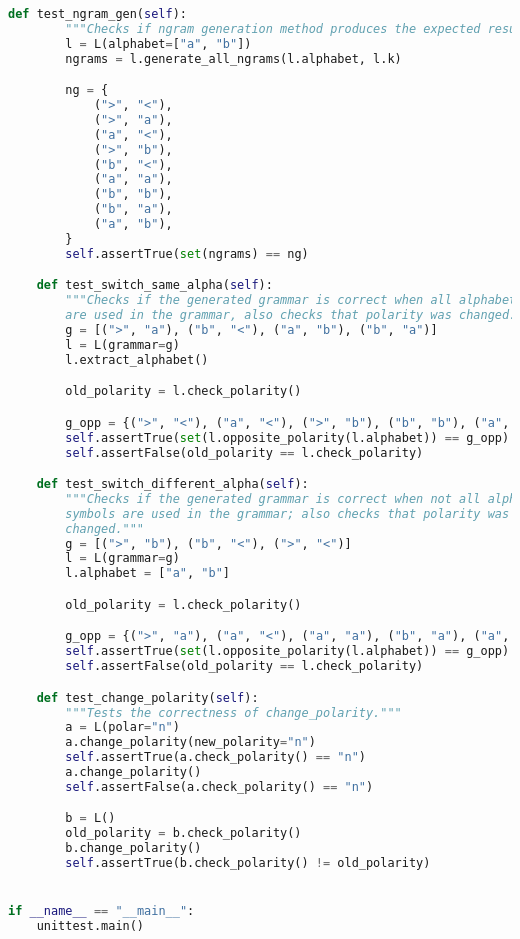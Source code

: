 \begin{lstlisting}[language=Python]
    def test_ngram_gen(self):
        """Checks if ngram generation method produces the expected results."""
        l = L(alphabet=["a", "b"])
        ngrams = l.generate_all_ngrams(l.alphabet, l.k)

        ng = {
            (">", "<"),
            (">", "a"),
            ("a", "<"),
            (">", "b"),
            ("b", "<"),
            ("a", "a"),
            ("b", "b"),
            ("b", "a"),
            ("a", "b"),
        }
        self.assertTrue(set(ngrams) == ng)

    def test_switch_same_alpha(self):
        """Checks if the generated grammar is correct when all alphabet symbols
        are used in the grammar, also checks that polarity was changed."""
        g = [(">", "a"), ("b", "<"), ("a", "b"), ("b", "a")]
        l = L(grammar=g)
        l.extract_alphabet()

        old_polarity = l.check_polarity()

        g_opp = {(">", "<"), ("a", "<"), (">", "b"), ("b", "b"), ("a", "a")}
        self.assertTrue(set(l.opposite_polarity(l.alphabet)) == g_opp)
        self.assertFalse(old_polarity == l.check_polarity)

    def test_switch_different_alpha(self):
        """Checks if the generated grammar is correct when not all alphabet
        symbols are used in the grammar; also checks that polarity was
        changed."""
        g = [(">", "b"), ("b", "<"), (">", "<")]
        l = L(grammar=g)
        l.alphabet = ["a", "b"]

        old_polarity = l.check_polarity()

        g_opp = {(">", "a"), ("a", "<"), ("a", "a"), ("b", "a"), ("a", "b"), ("b", "b")}
        self.assertTrue(set(l.opposite_polarity(l.alphabet)) == g_opp)
        self.assertFalse(old_polarity == l.check_polarity)

    def test_change_polarity(self):
        """Tests the correctness of change_polarity."""
        a = L(polar="n")
        a.change_polarity(new_polarity="n")
        self.assertTrue(a.check_polarity() == "n")
        a.change_polarity()
        self.assertFalse(a.check_polarity() == "n")

        b = L()
        old_polarity = b.check_polarity()
        b.change_polarity()
        self.assertTrue(b.check_polarity() != old_polarity)


if __name__ == "__main__":
    unittest.main()

\end{lstlisting}


